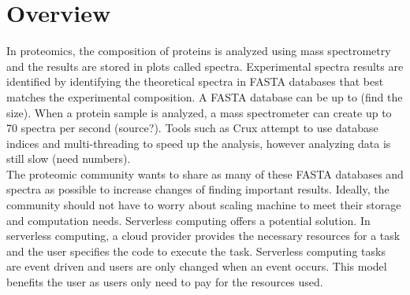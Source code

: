 \newcommand{\LineComment}[1]{\Statex \hfill\textit{#1}}
\vspace{-0.15in}
\section{Overview}
In proteomics, the composition of proteins is analyzed using mass spectrometry and the results are stored in plots called spectra.
Experimental spectra results are identified by identifying the theoretical spectra in FASTA databases that best matches the experimental composition.
A FASTA database can be up to (find the size).
When a protein sample is analyzed, a mass spectrometer can create up to 70 spectra per second (source?).
Tools such as Crux attempt to use database indices and multi-threading to speed up the analysis, however analyzing data is still slow (need numbers)\cite{crux}.\\
\newline
The proteomic community wants to share as many of these FASTA databases and spectra as possible to increase changes of finding important results.
Ideally, the community should not have to worry about scaling machine to meet their storage and computation needs. Serverless computing offers a potential solution.
In serverless computing, a cloud provider provides the necessary resources for a task and the user specifies the code to execute the task.
Serverless computing tasks are event driven and users are only changed when an event occurs.
This model benefits the user as users only need to pay for the resources used.
